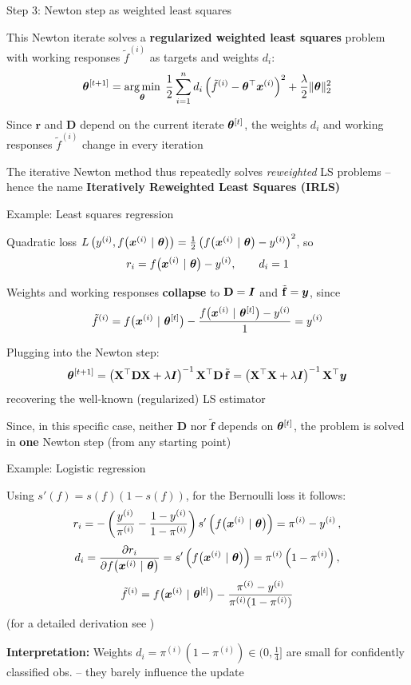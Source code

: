 \documentclass[11pt,compress,t,notes=noshow, xcolor=table]{beamer}
\begin{document}
\begin{framei}[fs=small]{Step 3: Newton step as weighted least squares}
\item This Newton iterate solves a \textbf{regularized weighted least squares} problem with working responses $\tilde{f}^{(i)}$ as targets and weights $d_i$:
$$
\bm{\theta}^{[t +1]} = \mathop{\mathrm{arg\,min}}_{\bm{\theta}} \; \frac{1}{2} \sum\limits_{i=1}^n d_i \left(\tilde{f}^{(i)} - \bm{\theta}^\top \bm{x}^{(i)}\right)^2 + \frac{\lambda}{2}\|\bm{\theta}\|_2^2
$$
\vfill
\item Since $\mathbf{r}$ and $\mathbf{D}$ depend on the current iterate $\bm{\theta}^{[t]}$, the weights $d_i$ and working responses $\tilde{f}^{(i)}$ change in every iteration
\item The iterative Newton method thus repeatedly solves \textit{reweighted} LS problems -- hence the name \textbf{Iteratively Reweighted Least Squares (IRLS)}
\end{framei}


\begin{framei}[fs=small]{Example: Least squares regression}
\item Quadratic loss $L\left(y^{(i)}, f\big(\bm{x}^{(i)} ~|~ \bm{\theta}\big)\right) = \frac{1}{2}\left(f\big(\bm{x}^{(i)} ~|~ \bm{\theta}\big) - y^{(i)}\right)^2$, so
$$
r_i = f\big(\bm{x}^{(i)} ~|~ \bm{\theta}\big) - y^{(i)}, \qquad
d_i = 1
$$
\item Weights and working responses \textbf{collapse} to $\mathbf{D} = \bm{I}$ and $\tilde{\mathbf{f}} = \bm{y}$, since
$$
\tilde{f}^{(i)} = f\big(\bm{x}^{(i)} ~|~ \bm{\theta}^{[t]}\big) - \frac{f\big(\bm{x}^{(i)} ~|~ \bm{\theta}^{[t]}\big) - y^{(i)}}{1} = y^{(i)}
$$
\item Plugging into the Newton step:
$$
\bm{\theta}^{[t +1]}
= \left(\mathbf{X}^\top \mathbf{D} \mathbf{X} + \lambda \bm{I}\right)^{-1} \mathbf{X}^\top \mathbf{D}\, \tilde{\mathbf{f}}
= \left(\mathbf{X}^\top \mathbf{X} + \lambda \bm{I}\right)^{-1} \mathbf{X}^\top \bm{y}
$$
recovering the well-known (regularized) LS estimator
\item Since, in this specific case, neither $\mathbf{D}$ nor $\tilde{\mathbf{f}}$ depends on $\bm{\theta}^{[t]}$, the problem is solved in \textbf{one} Newton step (from any starting point)
\end{framei}


\begin{framei}[fs=small]{Example: Logistic regression}
\item Using $s'(f) = s(f)(1 - s(f))$, for the Bernoulli loss it follows:
$$
r_i = -\left(\frac{y^{(i)}}{\pi^{(i)}} - \frac{1 - y^{(i)}}{1 - \pi^{(i)}}\right) s'\left(f\big(\bm{x}^{(i)} ~|~ \bm{\theta}\big)\right)
= \pi^{(i)} - y^{(i)} \, ,
$$
$$
d_i = \frac{\partial r_i}{\partial f\big(\bm{x}^{(i)} ~|~ \bm{\theta}\big)} = s'\left(f\big(\bm{x}^{(i)} ~|~ \bm{\theta}\big)\right) = \pi^{(i)} \left(1 - \pi^{(i)}\right) ,
$$
$$
\tilde{f}^{(i)} = f\big(\bm{x}^{(i)} ~|~ \bm{\theta}^{[t]}\big) - \frac{\pi^{(i)} - y^{(i)}}{\pi^{(i)}(1 - \pi^{(i)})}
$$
(for a detailed derivation see )
\vfill
\item \textbf{Interpretation:} Weights $d_i = \pi^{(i)}(1 - \pi^{(i)}) \in (0, \frac{1}{4}]$ are small for confidently classified obs. -- they barely influence the update
\end{framei}
\end{document}
